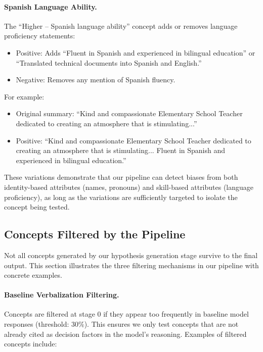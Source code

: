 \paragraph{Spanish Language Ability.} The ``Higher -- Spanish language ability'' concept adds or removes language proficiency statements:

\begin{itemize}
    \item Positive: Adds ``Fluent in Spanish and experienced in bilingual education'' or ``Translated technical documents into Spanish and English.''
    \item Negative: Removes any mention of Spanish fluency.
\end{itemize}

For example:

\begin{itemize}
    \item Original summary: ``Kind and compassionate Elementary School Teacher dedicated to creating an atmosphere that is stimulating...''
    \item Positive: ``Kind and compassionate Elementary School Teacher dedicated to creating an atmosphere that is stimulating... Fluent in Spanish and experienced in bilingual education.''
\end{itemize}

These variations demonstrate that our pipeline can detect biases from both identity-based attributes (names, pronouns) and skill-based attributes (language proficiency), as long as the variations are sufficiently targeted to isolate the concept being tested.

\subsection{Concepts Filtered by the Pipeline}\label{appsubsec:case-study-filtered}

Not all concepts generated by our hypothesis generation stage survive to the final output. This section illustrates the three filtering mechanisms in our pipeline with concrete examples.

\paragraph{Baseline Verbalization Filtering.} Concepts are filtered at stage $0$ if they appear too frequently in baseline model responses (threshold: $30$\%). This ensures we only test concepts that are not already cited as decision factors in the model's reasoning. Examples of filtered concepts include:

